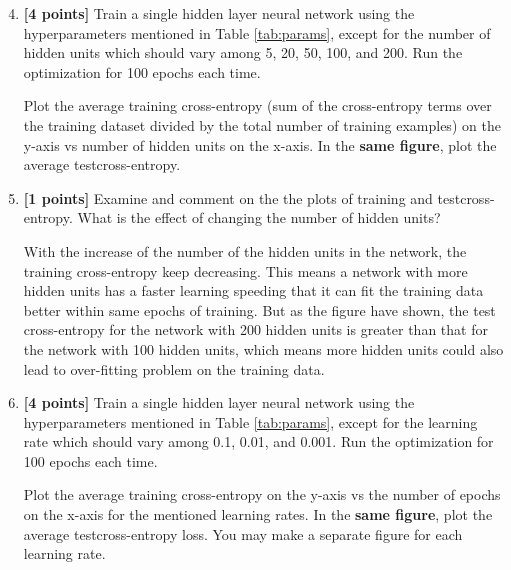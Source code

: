 \documentclass[11pt]{article}
\numberwithin{equation}{section} %
\numberwithin{figure}{section} %
\numberwithin{table}{section} %
\newcommand{\ntset}{test}
\newcommand{\points}[1]{{\bf [#1 points]}}
\begin{document}
\begin{enumerate}
\setcounter{enumi}{3}
\item \points{4}  
Train a single hidden layer neural network using the hyperparameters mentioned in Table \ref{tab:params}, except for the number of hidden units which should vary among 5, 20, 50, 100, and 200.  Run the optimization for 100 epochs each time.

Plot the average training cross-entropy (sum of the cross-entropy terms over the training dataset divided by the total number of training examples) on the y-axis vs number of hidden units on the x-axis. In the \textbf{same figure}, plot the average \ntset \thinspace cross-entropy.

 \begin{tcolorbox}[fit,height=10cm, width=15cm, blank, borderline={1pt}{-2pt}]
 \end{tcolorbox}



\clearpage
\item \points{1}
Examine and comment on the the plots of training and \ntset\thinspace cross-entropy. What is the effect of changing the number of hidden units?

 \begin{tcolorbox}[fit,height=8cm, width=15cm, blank, borderline={1pt}{-2pt}]
    With the increase of the number of the hidden units in the network, the training cross-entropy keep decreasing. This means a network with more hidden units has a faster learning speeding that it can fit the training data better within same epochs of training. But as the figure have shown, the test cross-entropy for the network with 200 hidden units is greater than that for the network with 100 hidden units, which means more hidden units could also lead to over-fitting problem on the training data.
    \end{tcolorbox}



\clearpage
\item \points{4} 
Train a single hidden layer neural network using the hyperparameters mentioned in Table \ref{tab:params}, except for the learning rate which should vary among 0.1, 0.01, and 0.001. Run the optimization for 100 epochs each time.

Plot the average training cross-entropy on the y-axis vs the number of epochs on the x-axis for the mentioned learning rates. In the \textbf{same figure}, plot the average \ntset\thinspace cross-entropy loss. You may make a separate figure for each learning rate.


\end{enumerate}
\end{document}
